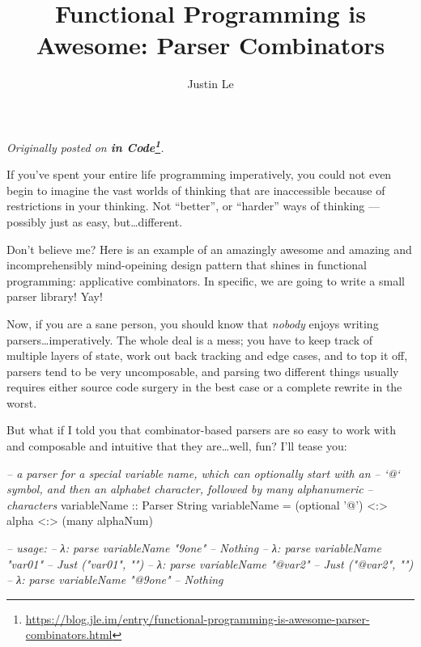 \documentclass[]{article}
\title{Functional Programming is Awesome: Parser Combinators}
\author{Justin Le}
\newenvironment{Shaded}{}{}
\newcommand{\CharTok}[1]{\textcolor[rgb]{0.25,0.44,0.63}{#1}}
\newcommand{\CommentTok}[1]{\textcolor[rgb]{0.38,0.63,0.69}{\textit{#1}}}
\newcommand{\DataTypeTok}[1]{\textcolor[rgb]{0.56,0.13,0.00}{#1}}
\newcommand{\FunctionTok}[1]{\textcolor[rgb]{0.02,0.16,0.49}{#1}}
\newcommand{\NormalTok}[1]{#1}
\newcommand{\OtherTok}[1]{\textcolor[rgb]{0.00,0.44,0.13}{#1}}
\renewcommand{\href}[2]{#2\footnote{\url{#1}}}
\begin{document}
\maketitle

\emph{Originally posted on
\textbf{\href{https://blog.jle.im/entry/functional-programming-is-awesome-parser-combinators.html}{in
Code}}.}

If you've spent your entire life programming imperatively, you could not even
begin to imagine the vast worlds of thinking that are inaccessible because of
restrictions in your thinking. Not ``better'', or ``harder'' ways of thinking
--- possibly just as easy, but\ldots{}different.

Don't believe me? Here is an example of an amazingly awesome and amazing and
incomprehensibly mind-opeining design pattern that shines in functional
programming: applicative combinators. In specific, we are going to write a small
parser library! Yay!

Now, if you are a sane person, you should know that \emph{nobody} enjoys writing
parsers\ldots{}imperatively. The whole deal is a mess; you have to keep track of
multiple layers of state, work out back tracking and edge cases, and to top it
off, parsers tend to be very uncomposable, and parsing two different things
usually requires either source code surgery in the best case or a complete
rewrite in the worst.

But what if I told you that combinator-based parsers are so easy to work with
and composable and intuitive that they are\ldots{}well, fun? I'll tease you:

\begin{Shaded}
\begin{Highlighting}[]
\CommentTok{-- a parser for a special variable name, which can optionally start with an}
\CommentTok{-- `@` symbol, and then an alphabet character, followed by many alphanumeric}
\CommentTok{-- characters}
\OtherTok{variableName ::} \DataTypeTok{Parser} \DataTypeTok{String}
\NormalTok{variableName }\FunctionTok{=}\NormalTok{ (optional }\CharTok{'@'}\NormalTok{) }\FunctionTok{<:>}\NormalTok{ alpha }\FunctionTok{<:>}\NormalTok{ (many alphaNum)}

\CommentTok{-- usage:}
\CommentTok{-- λ: parse variableName "9one"}
\CommentTok{-- Nothing}
\CommentTok{-- λ: parse variableName "var01"}
\CommentTok{-- Just ("var01", "")}
\CommentTok{-- λ: parse variableName "@var2"}
\CommentTok{-- Just ("@var2", "")}
\CommentTok{-- λ: parse variableName "@9one"}
\CommentTok{-- Nothing}
\end{Highlighting}
\end{Shaded}
\end{document}
